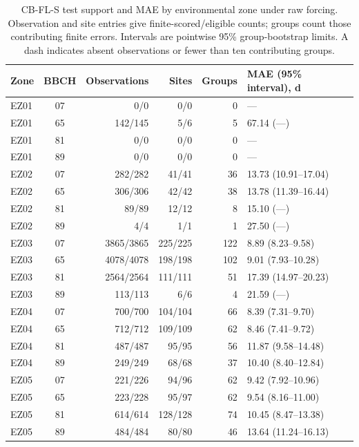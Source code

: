 \begin{table}[!htbp]
\centering
\caption{CB-FL-S test support and MAE by environmental zone under raw forcing. Observation and site entries give finite-scored/eligible counts; groups count those contributing finite errors. Intervals are pointwise 95\% group-bootstrap limits. A dash indicates absent observations or fewer than ten contributing groups.}
\label{tab:cb_fl_s_zone_support}
\small
\begin{tabular}{@{}lcrrrl@{}}
\toprule
Zone & BBCH & Observations & Sites & Groups & MAE (95\% interval), d \\
\midrule
EZ01 & 07 & 0/0 & 0/0 & 0 & --- \\
EZ01 & 65 & 142/145 & 5/6 & 5 & 67.14 (---) \\
EZ01 & 81 & 0/0 & 0/0 & 0 & --- \\
EZ01 & 89 & 0/0 & 0/0 & 0 & --- \\
\addlinespace
EZ02 & 07 & 282/282 & 41/41 & 36 & 13.73 (10.91--17.04) \\
EZ02 & 65 & 306/306 & 42/42 & 38 & 13.78 (11.39--16.44) \\
EZ02 & 81 & 89/89 & 12/12 & 8 & 15.10 (---) \\
EZ02 & 89 & 4/4 & 1/1 & 1 & 27.50 (---) \\
\addlinespace
EZ03 & 07 & 3865/3865 & 225/225 & 122 & 8.89 (8.23--9.58) \\
EZ03 & 65 & 4078/4078 & 198/198 & 102 & 9.01 (7.93--10.28) \\
EZ03 & 81 & 2564/2564 & 111/111 & 51 & 17.39 (14.97--20.23) \\
EZ03 & 89 & 113/113 & 6/6 & 4 & 21.59 (---) \\
\addlinespace
EZ04 & 07 & 700/700 & 104/104 & 66 & 8.39 (7.31--9.70) \\
EZ04 & 65 & 712/712 & 109/109 & 62 & 8.46 (7.41--9.72) \\
EZ04 & 81 & 487/487 & 95/95 & 56 & 11.87 (9.58--14.48) \\
EZ04 & 89 & 249/249 & 68/68 & 37 & 10.40 (8.40--12.84) \\
\addlinespace
EZ05 & 07 & 221/226 & 94/96 & 62 & 9.42 (7.92--10.96) \\
EZ05 & 65 & 223/228 & 95/97 & 62 & 9.54 (8.16--11.00) \\
EZ05 & 81 & 614/614 & 128/128 & 74 & 10.45 (8.47--13.38) \\
EZ05 & 89 & 484/484 & 80/80 & 46 & 13.64 (11.24--16.13) \\
\bottomrule
\end{tabular}
\end{table}
